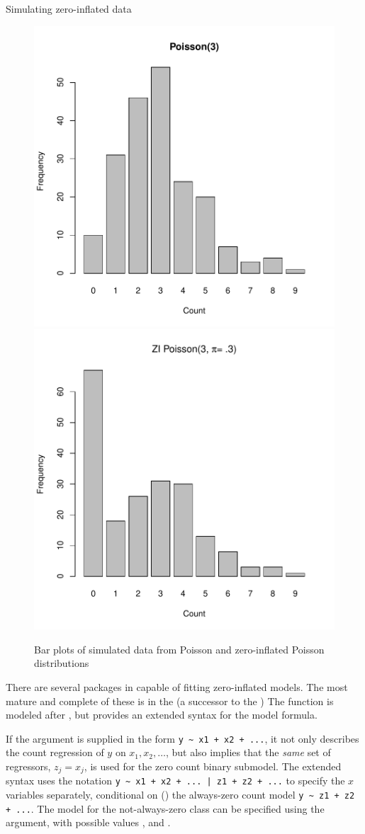 \documentclass[11pt]{book}\usepackage[]{graphicx}\usepackage[]{color}
\newenvironment{knitrout}{}{} %
\renewenvironment{knitrout}{\small\renewcommand{\baselinestretch}{.85}}{} %
\begin{document}
\begin{Example}[zipois]{Simulating zero-inflated data}
\begin{knitrout}
\begin{figure}[!htbp]
\centerline{\includegraphics[width=.49\textwidth]{ch09/fig/zipois-plot1} 
\includegraphics[width=.49\textwidth]{ch09/fig/zipois-plot2} }

\caption[Bar plots of simulated data from Poisson and zero-inflated Poisson distributions]{Bar plots of simulated data from Poisson and zero-inflated Poisson distributions\label{fig:zipois-plot}}
\end{figure}


\end{knitrout}



\end{Example}

There are several packages in \R capable of fitting zero-inflated models.  The most mature and
complete of these is  in 
the  (a successor to the )
The function  is modeled after , but provides an extended syntax
for the model formula.

If the  argument is supplied in the form
\verb|y ~ x1 + x2 + ...|, it not only describes the count regression of $y$ on
$x_1, x_2, \dots$, but also implies that the \emph{same} set of regressors, $z_j = x_j$,
is used for the zero count binary submodel.  The extended syntax  uses the
notation 
\verb#y ~ x1 + x2 + ... | z1 + z2 + ...# 
to specify the $x$ variables separately, conditional on (\code{|})
the always-zero count model \verb|y ~ z1 + z2 + ...|.
The model for the not-always-zero class can be specified using the
 argument, with possible values
,  and .
\end{document}
